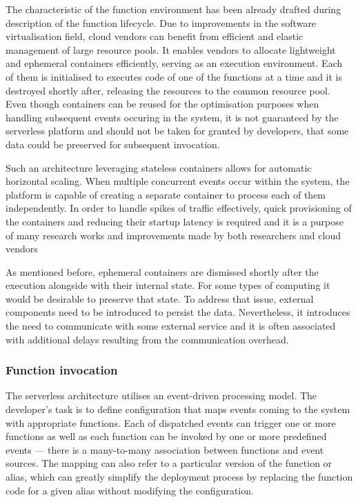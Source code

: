 The characteristic of the function environment has been already drafted during description of the function lifecycle. Due to improvements in the software virtualisation field, cloud vendors can benefit from efficient and elastic management of large resource pools. It enables vendors to allocate lightweight and ephemeral containers efficiently, serving as an execution environment. Each of them is initialised to executes code of one of the functions at a time and it is destroyed shortly after, releasing the resources to the common resource pool. Even though containers can be reused for the optimisation purposes when handling subsequent events occuring in the system, it is not guaranteed by the serverless platform and should not be taken for granted by developers, that some data could be preserved for subsequent invocation.

Such an architecture leveraging stateless containers allows for automatic horizontal scaling. When multiple concurrent events occur within the system, the platform is capable of creating a separate container to process each of them independently. In order to handle spikes of traffic effectively, quick provisioning of the containers and reducing their startup latency is required and it is a purpose of many research works and improvements made by both researchers and cloud vendors

As mentioned before, ephemeral containers are dismissed shortly after the execution alongside with their internal state. For some types of computing it would be desirable to preserve that state. To address that issue, external components need to be introduced to persist the data. Nevertheless, it introduces the need to communicate with some external service and it is often associated with additional delays resulting from the communication overhead.

\subsubsection{Function invocation} \label{section:serverless-function-invocation}

The serverless architecture utilises an event-driven processing model. The developer's task is to define configuration that maps events coming to the system with appropriate functions. Each of dispatched events can trigger one or more functions as well as each function can be invoked by one or more predefined events --- there is a many-to-many association between functions and event sources. The mapping can also refer to a particular version of the function or alias, which can greatly simplify the deployment process by replacing the function code for a given alias without modifying the configuration.

